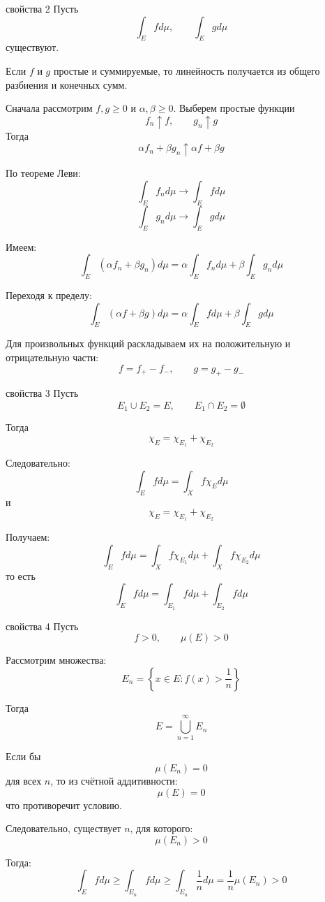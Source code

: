 \documentclass[12pt,a4paper]{article}
\begin{document}
\begin{proofbox}{свойства 2}
    Пусть
    \[
        \int_E f d\mu,\qquad \int_E g d\mu
    \]
    существуют.

    Если $f$ и $g$ простые и суммируемые, то линейность получается из общего разбиения и конечных сумм.

    Сначала рассмотрим $f,g\geq0$ и $\alpha,\beta\geq0$. Выберем простые функции
    \[
        f_n\uparrow f,\qquad g_n\uparrow g
    \]
    Тогда
    \[
        \alpha f_n+\beta g_n\uparrow\alpha f+\beta g
    \]

    По теореме Леви:
    \[
        \int_E f_n d\mu\to\int_Ef d\mu
    \]
    \[
        \int_E g_n d\mu\to\int_Eg d\mu
    \]

    Имеем:
    \[
        \int_E(\alpha f_n+\beta g_n) d\mu
        =
        \alpha\int_Ef_n d\mu+
        \beta\int_Eg_n d\mu
    \]

    Переходя к пределу:
    \[
        \int_E(\alpha f+\beta g) d\mu
        =
        \alpha\int_Ef d\mu+
        \beta\int_Eg d\mu
    \]

    Для произвольных функций раскладываем их на положительную и отрицательную части:
    \[
        f=f_+-f_-,
        \qquad
        g=g_+-g_-
    \]
\end{proofbox}

\begin{proofbox}{свойства 3}
    Пусть
    \[
        E_1\cup E_2=E,
        \qquad
        E_1\cap E_2=\emptyset
    \]

    Тогда
    \[
        \chi_E=\chi_{E_1}+\chi_{E_2}
    \]

    Следовательно:
    \[
        \int_E f d\mu
        =
        \int_Xf\chi_E d\mu
    \]
    и
    \[
        \chi_E=\chi_{E_1}+\chi_{E_2}
    \]

    Получаем:
    \[
        \int_Ef d\mu
        =
        \int_Xf\chi_{E_1} d\mu+
        \int_Xf\chi_{E_2} d\mu
    \]
    то есть
    \[
        \int_Ef d\mu
        =
        \int_{E_1}f d\mu+
        \int_{E_2}f d\mu
    \]
\end{proofbox}

\begin{proofbox}{свойства 4}
    Пусть
    \[
        f>0,\qquad \mu(E)>0
    \]

    Рассмотрим множества:
    \[
        E_n=\left\{x\in E:f(x)>\frac1n\right\}
    \]

    Тогда
    \[
        E=\bigcup_{n=1}^{\infty}E_n
    \]

    Если бы
    \[
        \mu(E_n)=0
    \]
    для всех $n$, то из счётной аддитивности:
    \[
        \mu(E)=0
    \]
    что противоречит условию.

    Следовательно, существует $n$, для которого:
    \[
        \mu(E_n)>0
    \]

    Тогда:
    \[
        \int_Ef d\mu
        \geq
        \int_{E_n}f d\mu
        \geq
        \int_{E_n}\frac1n d\mu
        =
        \frac1n\mu(E_n)>0
    \]
\end{proofbox}
\end{document}
